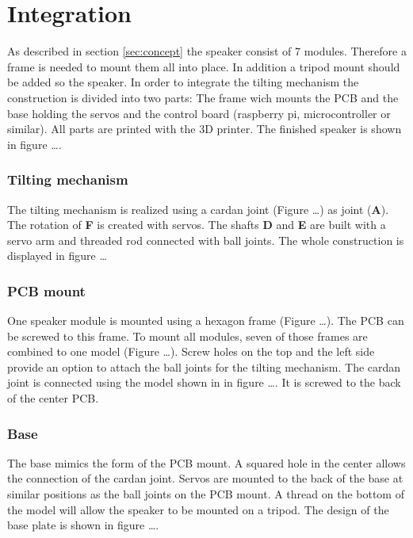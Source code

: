 \section{Integration}


As described in section \ref{sec:concept} the speaker consist of 7 modules. Therefore a frame is needed to mount them all into place. In addition a tripod mount should be added so the speaker. In order to integrate the tilting mechanism the construction is divided into two parts: The frame wich mounts the PCB and the base holding the servos and the control board (raspberry pi, microcontroller or similar). All parts are printed with the 3D printer. The finished speaker is shown in figure \dots.

\subsubsection*{Tilting mechanism}

The tilting mechanism is realized using a cardan joint (Figure \dots) as joint (\textbf{A}). The rotation of \textbf{F} is created with servos. The shafts \textbf{D} and \textbf{E} are built with a servo arm and threaded rod connected with ball joints. The whole construction is displayed in figure \dots

\subsubsection*{PCB mount}

One speaker module is mounted using a hexagon frame (Figure \dots). The PCB can be screwed to this frame. To mount all modules, seven of those frames are combined to one model (Figure \dots). Screw holes on the top and the left side provide an option to attach the ball joints for the tilting mechanism. The cardan joint is connected using the model shown in in figure \dots. It is screwed to the back of the center PCB.

\subsubsection*{Base}

The base mimics the form of the PCB mount. A squared hole in the center allows the connection of the cardan joint. Servos are mounted to the back of the base at similar positions as the ball joints on the PCB mount. A thread on the bottom of the model will allow the speaker to be mounted on a tripod. The design of the base plate is shown in figure \dots.